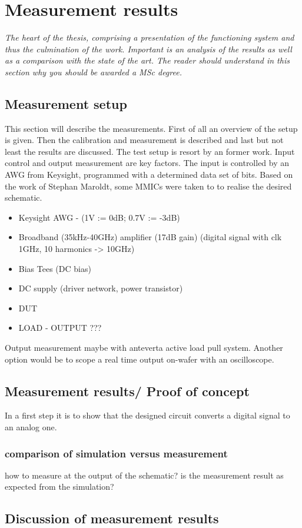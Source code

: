 \chapter{Measurement results}
\textit{The heart of the thesis, comprising a presentation of the functioning system and thus the culmination of the work. Important is an analysis of the results as well as a comparison with the state of the art. The reader should understand in this section why you should be awarded a MSc degree.}
\section{Measurement setup}
This section will describe the measurements. First of all an overview of the setup is given. Then the calibration and measurement is described and last but not least the results are discussed. The test setup is resort by an former work.
Input control and output measurement are key factors. The input is controlled by an AWG from Keysight, programmed with a determined data set of bits. Based on the work of Stephan Maroldt, some MMICs were taken to to realise the desired schematic. 
\begin{itemize}
	\item Keysight AWG - (1V := 0dB; 0.7V := -3dB)
	\item Broadband (35kHz-40GHz) amplifier (17dB gain) (digital signal with clk 1GHz, 10 harmonics -> 10GHz)
	\item Bias Tees (DC bias)
	\item DC supply (driver network, power transistor)
	\item DUT
	\item LOAD - OUTPUT ???
\end{itemize}
Output measurement maybe with anteverta active load pull system. Another option would be to scope a real time output on-wafer with an oscilloscope.
\section{Measurement results/ Proof of concept}
In a first step it is to show that the designed circuit converts a digital signal to an analog one.

\subsection*{comparison of simulation versus measurement}
how to measure at the output of the schematic? is the measurement result as expected from the simulation?

\section{Discussion of measurement results}